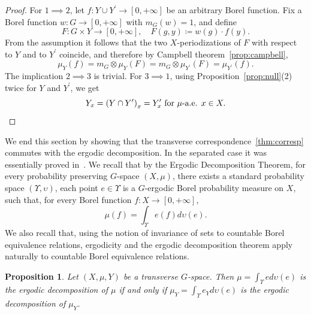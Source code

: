 \documentclass{amsart}
\numberwithin{equation}{subsection}
\newtheorem{prop}[thm]{Proposition}
\theoremstyle{remark}
\begin{document}
\begin{proof}
For \(1\implies 2\), let \(f:Y\cup Y^{\prime}\to\left[0,+\infty\right]\) be an arbitrary Borel function. Fix a Borel function \(w:G\to\left[0,+\infty\right]\) with \(m_{G}\left(w\right)=1\), and define
\[F:G\times Y\longrightarrow\left[0,+\infty\right],\quad F\left(g,y\right)\coloneqq w\left(g\right)\cdot f\left(y\right).\]
From the assumption it follows that the two \(X\)-periodizations of \(F\) with respect to \(Y\) and to \(Y^{\prime}\) coincide, and therefore by Campbell theorem~\ref{prop:campbell},
\[\mu_{Y}\left(f\right)=m_{G}\otimes\mu_{Y}\left(F\right)=m_{G}\otimes\mu_{Y^{\prime}}\left(F\right)=\mu_{Y^{\prime}}\left(f\right).\]
The implication \(2\implies 3\) is trivial. For \(3\implies 1\), using Proposition~\ref{prop:null}(2) twice for \(Y\) and \(Y^{\prime}\), we get
\[Y_{x}=\left(Y\cap Y^{\prime}\right)_{x}=Y_{x}^{\prime}\text{ for }\mu\text{-a.e. }x\in X.\qedhere\]
\end{proof}

We end this section by showing that the transverse correspondence~\ref{thm:corresp} commutes with the ergodic decomposition. In the separated case it was essentially proved in~\cite[Lemma~4.9]{bjorklund2025int}. We recall that by the Ergodic Decomposition Theorem, for every probability preserving \(G\)-space \(\left(X,\mu\right)\), there exists a standard probability space \(\left(\Upsilon,\upsilon\right)\), each point \(e\in\Upsilon\) is a \(G\)-ergodic Borel probability measure on \(X\), such that, for every Borel function \(f:X\to\left[0,+\infty\right]\),
\[\mu\left(f\right)=\int_{\Upsilon}e\left(f\right)d\upsilon\left(e\right).\]
We also recall that, using the notion of invariance of sets to countable Borel equivalence relations, ergodicity and the ergodic decomposition theorem apply naturally to countable Borel equivalence relations.

\begin{prop}
Let \(\left(X,\mu,Y\right)\) be a transverse \(G\)-space. Then \(\mu=\int_{\Upsilon}e d\upsilon\left(e\right)\) is the ergodic decomposition of  \(\mu\) if and only if \(\mu_{Y}=\int_{\Upsilon}e_{Y}d\upsilon\left(e\right)\) is the ergodic decomposition of \(\mu_{Y}\).
\end{prop}
\end{document}
